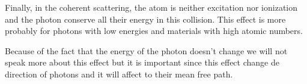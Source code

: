 Finally, in the coherent scattering, the atom is neither excitation nor ionization and the photon conserve all their energy in this collision. This effect is more probably for photons with low energies and materials with high atomic numbers.

Because of the fact that the energy of the photon doesn't change we will not speak more about this effect but it is important since this effect change de direction of photons and it will affect to their mean free path.